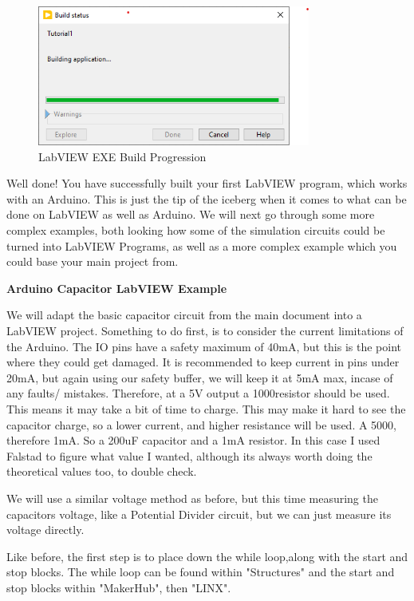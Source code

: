 \documentclass[a4paper,11pt]{report}
\begin{document}
\begin{figure}[H]
\centering
\includegraphics[width=0.8\textwidth]{screenshots/labview44}
\caption{LabVIEW EXE Build Progression}
\end{figure}

Well done! You have successfully built your first LabVIEW program, which works with an Arduino. This is just the tip of the iceberg when it comes to what can be done on LabVIEW as well as Arduino. We will next go through some more complex examples, both looking how some of the simulation circuits could be turned into LabVIEW Programs, as well as a more complex example which you could base your main project from.

\textbf{Arduino Capacitor LabVIEW Example}

We will adapt the basic capacitor circuit from the main document into a LabVIEW project. Something to do first, is to consider the current limitations of the Arduino. The IO pins have a safety maximum of 40mA, but this is the point where they could get damaged. It is recommended to keep current in pins under 20mA, but again using our safety buffer, we will keep it at 5mA max, incase of any faults/ mistakes. Therefore, at a 5V output a 1000\ohm resistor should be used. This means it may take a bit of time to charge. This may make it hard to see the capacitor charge, so a lower current, and higher resistance will be used. A 5000\ohm, therefore 1mA. So a 200uF capacitor and a 1mA resistor. In this case I used Falstad to figure what value I wanted, although its always worth doing the theoretical values too, to double check.

We will use a similar voltage method as before, but this time measuring the capacitors voltage, like a Potential Divider circuit, but we can just measure its voltage directly.

Like before, the first step is to place down the while loop,along with the start and stop blocks. The while loop can be found within "Structures" and the start and stop blocks within "MakerHub", then "LINX".
\end{document}
